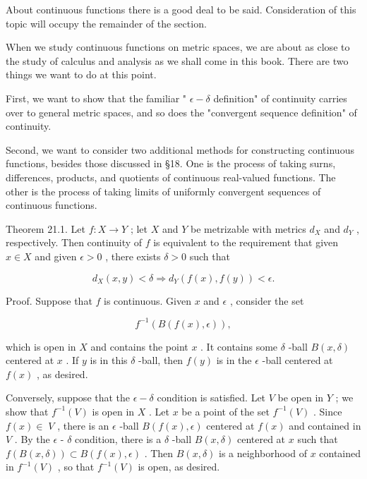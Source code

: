 \documentclass[10pt]{article}
\begin{document}
About continuous functions there is a good deal to be said. Consideration of this topic will occupy the remainder of the section.

When we study continuous functions on metric spaces, we are about as close to the study of calculus and analysis as we shall come in this book. There are two things we want to do at this point.

First, we want to show that the familiar " \(\epsilon  - \delta\) definition" of continuity carries over to general metric spaces, and so does the "convergent sequence definition" of continuity.

Second, we want to consider two additional methods for constructing continuous functions, besides those discussed in §18. One is the process of taking surns, differences, products, and quotients of continuous real-valued functions. The other is the process of taking limits of uniformly convergent sequences of continuous functions.

Theorem 21.1. Let \(f : X \rightarrow  Y\) ; let \(X\) and \(Y\) be metrizable with metrics \({d}_{X}\) and \({d}_{Y}\) , respectively. Then continuity of \(f\) is equivalent to the requirement that given \(x \in  X\) and given \(\epsilon  > 0\) , there exists \(\delta  > 0\) such that

\[
{d}_{X}\left( {x,y}\right)  < \delta  \Rightarrow  {d}_{Y}\left( {f\left( x\right) ,f\left( y\right) }\right)  < \epsilon .
\]

Proof. Suppose that \(f\) is continuous. Given \(x\) and \(\epsilon\) , consider the set

\[
{f}^{-1}\left( {B\left( {f\left( x\right) ,\epsilon }\right) }\right) ,
\]

which is open in \(X\) and contains the point \(x\) . It contains some \(\delta\) -ball \(B\left( {x,\delta }\right)\) centered at \(x\) . If \(y\) is in this \(\delta\) -ball, then \(f\left( y\right)\) is in the \(\epsilon\) -ball centered at \(f\left( x\right)\) , as desired.

Conversely, suppose that the \(\epsilon  - \delta\) condition is satisfied. Let \(V\) be open in \(Y\) ; we show that \({f}^{-1}\left( V\right)\) is open in \(X\) . Let \(x\) be a point of the set \({f}^{-1}\left( V\right)\) . Since \(f\left( x\right)  \in \; V\) , there is an \(\epsilon\) -ball \(B\left( {f\left( x\right) ,\epsilon }\right)\) centered at \(f\left( x\right)\) and contained in \(V\) . By the \(\epsilon\) - \(\delta\) condition, there is a \(\delta\) -ball \(B\left( {x,\delta }\right)\) centered at \(x\) such that \(f\left( {B\left( {x,\delta }\right) }\right)  \subset  B\left( {f\left( x\right) ,\epsilon }\right)\) . Then \(B\left( {x,\delta }\right)\) is a neighborhood of \(x\) contained in \({f}^{-1}\left( V\right)\) , so that \({f}^{-1}\left( V\right)\) is open, as desired.
\end{document}
